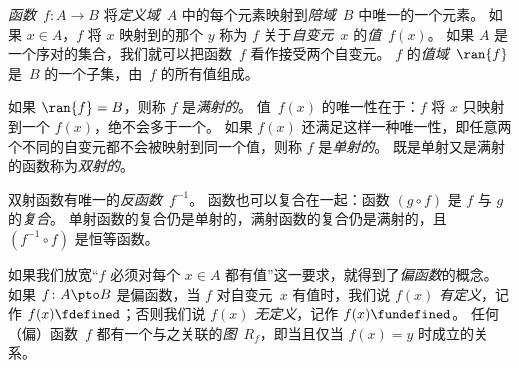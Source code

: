 \emph{函数}~$f\colon A \to B$ 将\emph{定义域}~$A$ 中的每个元素映射到\emph{陪域}~$B$ 中唯一的一个元素。
如果 $x \in A$，$f$ 将 $x$ 映射到的那个 $y$ 称为 $f$ 关于\emph{自变元}~$x$ 的\emph{值}~$f(x)$。
如果 $A$ 是一个序对的集合，我们就可以把函数~$f$ 看作接受两个自变元。
$f$ 的\emph{值域}~$\ran{f}$ 是~$B$ 的一个子集，由~$f$ 的所有值组成。

如果 $\ran{f} = B$，则称 $f$ 是\emph{满射的}。
值~$f(x)$ 的唯一性在于：$f$ 将 $x$ 只映射到一个 $f(x)$，绝不会多于一个。
如果 $f(x)$ 还满足这样一种唯一性，即任意两个不同的自变元都不会被映射到同一个值，则称 $f$ 是\emph{单射的}。
既是单射又是满射的函数称为\emph{双射的}。

双射函数有唯一的\emph{反函数}~$f^{-1}$。
函数也可以复合在一起：函数 $(g \circ f)$ 是 $f$ 与 $g$ 的\emph{复合}。
单射函数的复合仍是单射的，满射函数的复合仍是满射的，且 $(f^{-1} \circ f)$ 是恒等函数。

如果我们放宽“$f$ 必须对每个 $x \in A$ 都有值”这一要求，就得到了\emph{偏函数}的概念。
如果 $f\colon A \pto B$ 是偏函数，当 $f$ 对自变元~$x$ 有值时，我们说 $f(x)$ \emph{有定义}，记作 $f(x) \fdefined$；否则我们说 $f(x)$ \emph{无定义}，记作 $f(x) \fundefined$。
任何（偏）函数~$f$ 都有一个与之关联的\emph{图}~$R_f$，即当且仅当 $f(x) = y$ 时成立的关系。